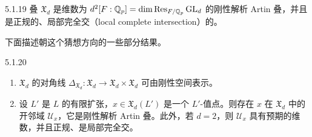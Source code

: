 \begin{conj}{5.1.19}\label{conj:a4-5-1-19}
叠 $\mathfrak{X}_d$ 是维数为 $d^2[F:\mathbb{Q}_p]=\dim\operatorname{Res}_{F/\mathbb{Q}_p}\mathrm{GL}_d$ 的刚性解析 Artin 叠，并且是正规的、局部完全交（local complete intersection）的。
\end{conj}

下面描述朝这个猜想方向的一些部分结果。

\begin{thm}{5.1.20}\label{thm:a4-5-1-20}
\begin{enumerate}[label=(\roman*),leftmargin=2.4em,itemsep=0.2em]
\item $\mathfrak{X}_d$ 的对角线 $\Delta_{\mathfrak{X}_d}:\mathfrak{X}_d\to\mathfrak{X}_d\times\mathfrak{X}_d$ 可由刚性空间表示。
\item 设 $L'$ 是 $L$ 的有限扩张，$x\in\mathfrak{X}_d(L')$ 是一个 $L'$-值点。则存在 $x$ 在 $\mathfrak{X}_d$ 中的开邻域 $\mathcal{U}_x$，它是刚性解析 Artin 叠。此外，若 $d=2$，则 $\mathcal{U}_x$ 具有预期的维数，并且正规、是局部完全交。
\end{enumerate}
\end{thm}

